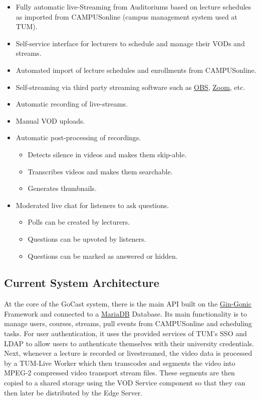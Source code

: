 \begin{itemize}
    \item Fully automatic live-Streaming from Auditoriums based on lecture schedules as imported from CAMPUSonline (campus management system used at \ac{TUM}).
    \item Self-service interface for lecturers to schedule and manage their \ac{VOD}s and streams.
    \item Automated import of lecture schedules and enrollments from CAMPUSonline.
    \item Self-streaming via third party streaming software such as \href{https://obsproject.com/}{OBS}, \href{https://zoom.us}{Zoom}, etc.
    \item Automatic recording of live-streams.
    \item Manual \ac{VOD} uploads.
    \item Automatic post-processing of recordings.
    \begin{itemize}
        \item Detects silence in videos and makes them skip-able.
        \item Transcribes videos and makes them searchable.
        \item Generates thumbnails.
    \end{itemize}
    \item Moderated live chat for listeners to ask questions.
    \begin{itemize}
        \item Polls can be created by lecturers.
        \item Questions can be upvoted by listeners.
        \item Questions can be marked as answered or hidden.
    \end{itemize}
\end{itemize}

\subsection{Current System Architecture}

At the core of the GoCast system, there is the main \ac{API} built on the \href{https://github.com/gin-gonic/gin}{Gin-Gonic} Framework and connected to a \href{https://mariadb.org/}{MariaDB} Database. Its main functionality is to manage users, courses, streams, pull events from CAMPUSonline and scheduling tasks. For user authentication, it uses the provided services of \ac{TUM}'s \ac{SSO} and \ac{LDAP} to allow users to authenticate themselves with their university credentials. 
Next, whenever a lecture is recorded or livestreamed, the video data is processed by a TUM-Live Worker which then transcodes and segments the video into MPEG-2 compressed video transport stream files. These segments are then copied to a shared storage using the VOD Service component so that they can then later be distributed by the Edge Server.

